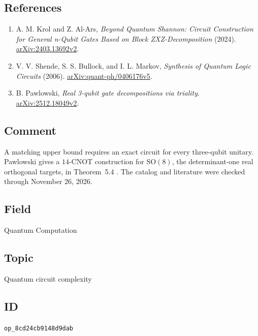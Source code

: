 \subsection*{References}

\begin{enumerate}[label={},leftmargin=4.8em,labelsep=0.5em]
  \footnotesize
  \item[\textup{[KA24]}]\label{ref:d11-block-zxz}
  A. M. Krol and Z. Al-Ars, \emph{Beyond Quantum Shannon: Circuit Construction for General n-Qubit Gates Based on Block ZXZ-Decomposition} (2024). \href{https://arxiv.org/abs/2403.13692v2}{arXiv:2403.13692v2}.

  \item[\textup{[SBM06]}]\label{ref:d11-logic-synthesis}
  V. V. Shende, S. S. Bullock, and I. L. Markov, \emph{Synthesis of Quantum Logic Circuits} (2006). \href{https://arxiv.org/abs/quant-ph/0406176v5}{arXiv:quant-ph/0406176v5}.

  \item[\textup{[Paw25]}]\label{ref:d11-triality}
  B. Pawlowski, \emph{Real 3-qubit gate decompositions via triality}. \href{https://arxiv.org/abs/2512.18049v2}{arXiv:2512.18049v2}.
\end{enumerate}

\subsection*{Comment}

A matching upper bound requires an exact circuit for every three-qubit unitary. Pawlowski gives a $14$-CNOT construction for $\mathrm{SO}(8)$, the determinant-one real orthogonal targets, in Theorem~5.4 . The catalog and literature were checked through November 26, 2026.

\subsection*{Field}

Quantum Computation

\subsection*{Topic}

Quantum circuit complexity

\subsection*{ID}

\texttt{op\_8cd24cb9148d9dab}
